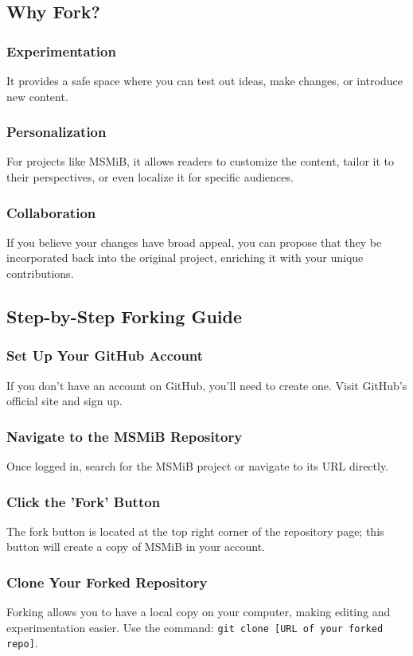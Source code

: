 \documentclass{book}
\begin{document}
\subsection*{Why Fork?}
\subsubsection*{Experimentation}
It provides a safe space where you can test out ideas, make changes, or introduce new content.

\subsubsection*{Personalization}
For projects like MSMiB, it allows readers to customize the content, tailor it to their perspectives, or even localize it for specific audiences.

\subsubsection*{Collaboration}
If you believe your changes have broad appeal, you can propose that they be incorporated back into the original project, enriching it with your unique contributions.

\subsection*{Step-by-Step Forking Guide}
\subsubsection*{Set Up Your GitHub Account}
If you don't have an account on GitHub, you'll need to create one. Visit GitHub's official site and sign up.

\subsubsection*{Navigate to the MSMiB Repository}
Once logged in, search for the MSMiB project or navigate to its URL directly.

\subsubsection*{Click the 'Fork' Button}
The fork button is located at the top right corner of the repository page; this button will create a copy of MSMiB in your account.

\subsubsection*{Clone Your Forked Repository}
Forking allows you to have a local copy on your computer, making editing and experimentation easier. Use the command: \texttt{git clone [URL of your forked repo]}.
\end{document}
